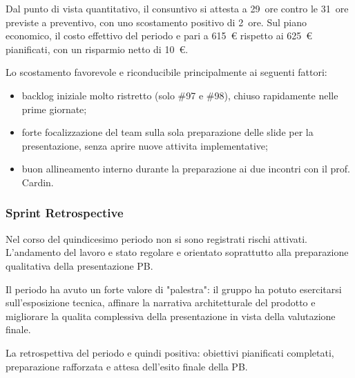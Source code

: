 \documentclass[a4paper, 11pt, oneside]{scrartcl} %
\begin{document}
Dal punto di vista quantitativo, il consuntivo si attesta a 29~ore contro le 31~ore previste a preventivo, con uno scostamento positivo di 2~ore. Sul piano economico, il costo effettivo del periodo e pari a 615~€ rispetto ai 625~€ pianificati, con un risparmio netto di 10~€.

Lo scostamento favorevole e riconducibile principalmente ai seguenti fattori:
\begin{itemize}[noitemsep, topsep=2pt]
    \item backlog iniziale molto ristretto (solo \#97 e \#98), chiuso rapidamente nelle prime giornate;
    \item forte focalizzazione del team sulla sola preparazione delle slide per la presentazione, senza aprire nuove attivita implementative;
    \item buon allineamento interno durante la preparazione ai due incontri con il prof. Cardin.
\end{itemize}

\subsubsection*{Sprint Retrospective}

Nel corso del quindicesimo periodo non si sono registrati rischi attivati. L'andamento del lavoro e stato regolare e orientato soprattutto alla preparazione qualitativa della presentazione PB.

Il periodo ha avuto un forte valore di "palestra": il gruppo ha potuto esercitarsi sull'esposizione tecnica, affinare la narrativa architetturale del prodotto e migliorare la qualita complessiva della presentazione in vista della valutazione finale.

La retrospettiva del periodo e quindi positiva: obiettivi pianificati completati, preparazione rafforzata e attesa dell'esito finale della PB.
\end{document}
